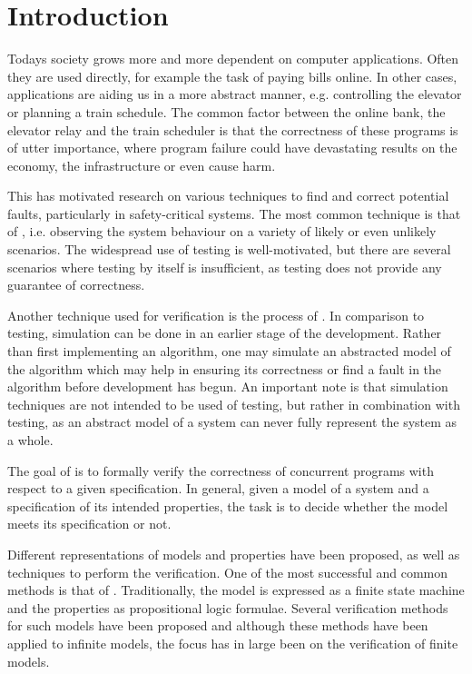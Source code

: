 \newpage
\section{Introduction}
Todays society grows more and more dependent on computer applications. Often they are used directly, for example the task of paying bills online. In other cases, applications are aiding us in a more abstract manner, e.g. controlling the elevator or planning a train schedule. The common factor between the online bank, the elevator relay and the train scheduler is that the correctness of these programs is of utter importance, where program failure could have devastating results on the economy, the infrastructure or even cause harm.

This has motivated research on various techniques to find and correct potential faults, particularly in safety-critical systems. The most common technique is that of , i.e. observing the system behaviour on a variety of likely or even unlikely scenarios. The widespread use of testing is well-motivated, but there are several scenarios where testing by itself is insufficient, as testing does not provide any guarantee of correctness.

Another technique used for verification is the process of . In comparison to testing, simulation can be done in an earlier stage of the development. Rather than first implementing an algorithm, one may simulate an abstracted model of the algorithm which may help in ensuring its correctness or find a fault in the algorithm before development has begun. An important note is that simulation techniques are not intended to be used  of testing, but rather in combination with testing, as an abstract model of a system can never fully represent the system as a whole.

The goal of  is to formally verify the correctness of concurrent programs with respect  to a given specification. In general, given a model of a system and a specification of its intended properties, the task is to decide whether the model meets its specification or not.

Different representations of models and properties have been proposed, as well as techniques to perform the verification. One of the most successful and common methods is that of . Traditionally, the model is expressed as a finite state machine and the properties as propositional logic formulae. Several verification methods for such models have been proposed\cite{mcmillan1993symbolic} and although these methods have been applied to infinite models\cite{705644}, the focus has in large been on the verification of finite models.

